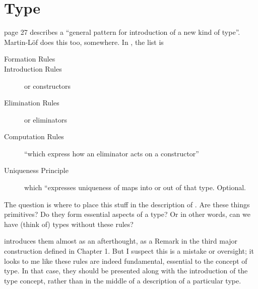 \section{Type}
\label{sect:type}

\HoTTB page 27 describes a ``general pattern for introduction of a new
kind of type''.  Martin-L\"{o}f does this too, somewhere.  In \HoTTB,
the list is

\begin{description}
\item [Formation Rules]
\item [Introduction Rules]  or constructors
\item [Elimination Rules] or eliminators
\item [Computation Rules]  ``which express how an eliminator acts on a constructor''
\item [Uniqueness Principle] which ``expresses uniqueness of maps into
  or out of that type.  Optional.
\end{description}


The question is where to place this stuff in the description of \HoTT.
Are these things primitives?  Do they form essential aspects of a
type?  Or in other words, can we have (think of) types without these rules?

\HoTTB introduces them almost as an afterthought, as a Remark in the
third major construction defined in Chapter 1.  But I suspect this is
a mistake or oversight; it looks to me like these rules are indeed
fundamental, essential to the concept of type.  In that case, they
should be presented along with the introduction of the type concept,
rather than in the middle of a description of a particular type.

